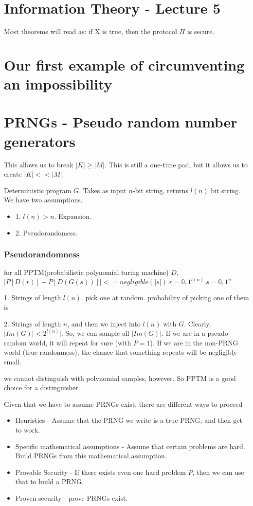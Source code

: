 \section{Information Theory - Lecture 5}


Most theorems will read as: if X is true, then the protocol $\Pi$ is secure.

\section{Our first example of circumventing an impossibility}

\section{PRNGs - Pseudo random number generators}
This allows us to break $|K| \geq |M|$.
This is still a one-time pad, but it allows us to create $|K| << |M|$.


Deterministic program $G$.  Takes as input $n$-bit string, returns $l(n)$ bit string. We have two
assumptions.
\begin{itemize}
\item 1. $l(n) > n$. Expansion.
\item 2. Pseudorandomess.
\end{itemize}

\subsubsection{Pseudorandomness}
for all PPTM(probabilistic polynomial turing machine) $D$,
$ |P[D(r)] - P[D(G(s))]| <= negligible(|s|).r = {0, 1}^{l(n)}. s = {0, 1}^n$


1. Strings of length $l(n)$. pick one at random. probability of picking one of them is

2. Strings of length $n$, and then we inject into $l(n)$ with $G$. Clearly, $|Im(G)| < 2^{l(n)}|$.
So, we can sample all $|Im(G)|$. If we are in a pseudo-random world, it will repeat for sure (with $P = 1$).
If we are in the non-PRNG world (true randomness), the chance that something repeats will be negligibly small.

we cannot distinguish with polynomial samples, however.  So PPTM is a good choice for a distinguisher.


Given that we have to assume PRNGs exist, there are different ways to proceed
\begin{itemize}
\item Heuristics - Assume that the PRNG we write is a true PRNG, and then get to work.
\item Specific mathematical assumptions - Assume that certain problems are hard. Build PRNGs from this mathematical assumption.
\item Provable Security - If there exists even one hard problem $P$, then we can use that to build a PRNG.
\item Proven security - prove PRNGs exist.
\end{itemize}


